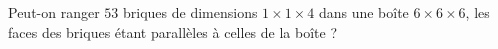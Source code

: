 Peut-on ranger $53$ briques de dimensions $1 \times 1 \times 4$ dans une boîte $6 \times 6 \times 6$, les faces des briques étant parallèles à celles de la boîte ?
